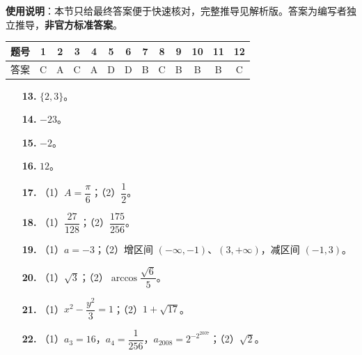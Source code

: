 
\begin{gknotice}
\textbf{使用说明}：本节只给最终答案便于快速核对，完整推导见解析版。答案为编写者独立推导，\textbf{非官方标准答案}。
\end{gknotice}

\begin{center}\begin{tabular}{ccccccccccccc}
\toprule
题号 & 1 & 2 & 3 & 4 & 5 & 6 & 7 & 8 & 9 & 10 & 11 & 12 \\
\midrule
答案 & C & A & C & A & D & D & B & C & B & B & B & C \\
\bottomrule
\end{tabular}\end{center}

\begin{itemize}[leftmargin=2.6em]
  \item[\textbf{13.}] $\{2,3\}$。
  \item[\textbf{14.}] $-23$。
  \item[\textbf{15.}] $-2$。
  \item[\textbf{16.}] $12$。
\end{itemize}

\begin{itemize}[leftmargin=2.6em]
  \item[\textbf{17.}] （1）$A=\dfrac{\pi}6$；（2）$\dfrac12$。
  \item[\textbf{18.}] （1）$\dfrac{27}{128}$；（2）$\dfrac{175}{256}$。
  \item[\textbf{19.}] （1）$a=-3$；（2）增区间 $(-\infty,-1)$、$(3,+\infty)$，减区间 $(-1,3)$。
  \item[\textbf{20.}] （1）$\sqrt3$；（2）$\arccos\dfrac{\sqrt6}5$。
  \item[\textbf{21.}] （1）$x^2-\dfrac{y^2}3=1$；（2）$1+\sqrt{17}$。
  \item[\textbf{22.}] （1）$a_3=16$，$a_4=\dfrac1{256}$，$a_{2008}=2^{-2^{2007}}$；（2）$\sqrt2$。
\end{itemize}
